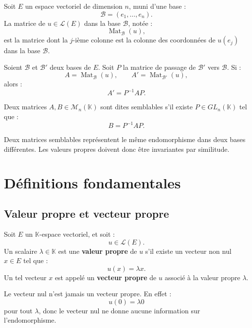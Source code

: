 \documentclass[11pt,a4paper]{article}
\newcommand{\K}{\mathbb K}
\newcommand{\M}{\mathcal M}
\newcommand{\Lcal}{\mathcal L}
\newcommand{\Mat}{\operatorname{Mat}}
\begin{document}
\begin{definitionbox}
Soit \(E\) un espace vectoriel de dimension \(n\), muni d'une base :
\[
\mathcal B=(e_1,\dots,e_n).
\]
La matrice de \(u\in\Lcal(E)\) dans la base \(\mathcal B\), notée :
\[
\Mat_{\mathcal B}(u),
\]
est la matrice dont la \(j\)-ième colonne est la colonne des coordonnées de \(u(e_j)\) dans la base \(\mathcal B\).
\end{definitionbox}

\begin{theorembox}
Soient \(\mathcal B\) et \(\mathcal B'\) deux bases de \(E\).  
Soit \(P\) la matrice de passage de \(\mathcal B'\) vers \(\mathcal B\).  
Si :
\[
A=\Mat_{\mathcal B}(u),
\qquad
A'=\Mat_{\mathcal B'}(u),
\]
alors :
\[
A'=P^{-1}AP.
\]
\end{theorembox}

\begin{definitionbox}
Deux matrices \(A,B\in\M_n(\K)\) sont dites semblables s'il existe \(P\in GL_n(\K)\) tel que :
\[
B=P^{-1}AP.
\]
\end{definitionbox}

\begin{retenirbox}
Deux matrices semblables représentent le même endomorphisme dans deux bases différentes.  
Les valeurs propres doivent donc être invariantes par similitude.
\end{retenirbox}

\section{Définitions fondamentales}

\subsection{Valeur propre et vecteur propre}

\begin{definitionbox}
Soit \(E\) un \(\K\)-espace vectoriel, et soit :
\[
u\in\Lcal(E).
\]
Un scalaire \(\lambda\in\K\) est une \textbf{valeur propre} de \(u\) s'il existe un vecteur non nul \(x\in E\) tel que :
\[
u(x)=\lambda x.
\]
Un tel vecteur \(x\) est appelé un \textbf{vecteur propre} de \(u\) associé à la valeur propre \(\lambda\).
\end{definitionbox}

\begin{erreurbox}
Le vecteur nul n'est jamais un vecteur propre.  
En effet :
\[
u(0)=\lambda 0
\]
pour tout \(\lambda\), donc le vecteur nul ne donne aucune information sur l'endomorphisme.
\end{erreurbox}
\end{document}
